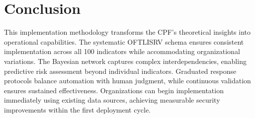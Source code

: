 \documentclass[10pt, twocolumn]{article}
\begin{document}
\section{Conclusion}

This implementation methodology transforms the CPF's theoretical insights into operational capabilities. The systematic OFTLISRV schema ensures consistent implementation across all 100 indicators while accommodating organizational variations. The Bayesian network captures complex interdependencies, enabling predictive risk assessment beyond individual indicators. Graduated response protocols balance automation with human judgment, while continuous validation ensures sustained effectiveness. Organizations can begin implementation immediately using existing data sources, achieving measurable security improvements within the first deployment cycle.
\end{document}
